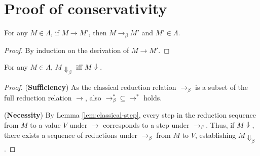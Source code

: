 \section{Proof of conservativity} \label{sec:conserv-proof}
\begin{lem} \label{lem:classical-step}
  For any $M \in \Lambda$, if $M \longrightarrow M'$, then $M \longrightarrow_\beta M'$ and $M' \in \Lambda$.
\end{lem}
\begin{proof}
  By induction on the derivation of $M \longrightarrow M'$.
\end{proof}

\begin{lem} \label{lem:classical-eval}
  For any $M \in \Lambda$, $M \Downarrow_\beta$ iff $M \Downarrow$.
\end{lem}
\begin{proof}
  (\textbf{Sufficiency})
  As the classical reduction relation $\longrightarrow_\beta$ is a subset of the full reduction relation $\longrightarrow$, also $\longrightarrow_\beta^* \subseteq \longrightarrow^*$ holds.

  (\textbf{Necessity})
  By Lemma \ref{lem:classical-step}, every step in the reduction sequence from $M$ to a value $V$ under $\longrightarrow$ corresponds to a step under $\longrightarrow_\beta$.
  Thus, if $M \Downarrow$, there exists a sequence of reductions under $\longrightarrow_\beta$ from $M$ to $V$, establishing $M \Downarrow_\beta$.
\end{proof}

